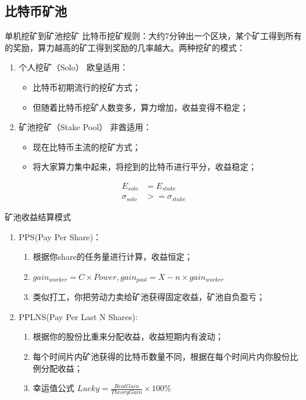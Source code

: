 \documentclass[11pt]{beamer}
\begin{document}
\subsection{比特币矿池}
\begin{frame}{单机挖矿到矿池挖矿}
	比特币挖矿规则：大约7分钟出一个区块，某个矿工得到所有的奖励，算力越高的矿工得到奖励的几率越大。两种挖矿的模式：
	\begin{enumerate}
		\item 个人挖矿（Solo）{\color{red} 欧皇适用}：
		      \begin{itemize}
			      \item 比特币初期流行的挖矿方式；
			      \item 但随着比特币挖矿人数变多，算力增加，收益变得不稳定；
		      \end{itemize}
		\item 矿池挖矿（Stake Pool）{\color{red} 非酋适用}：
		      \begin{itemize}
			      \item 现在比特币主流的挖矿方式；
			      \item 将大家算力集中起来，将挖到的比特币进行平分，收益稳定；
		      \end{itemize}
	\end{enumerate}
	\begin{align}
		E_{solo}      & =E_{stake}       \\
		\sigma_{solo} & >=\sigma_{stake}
	\end{align}
\end{frame}

\begin{frame}{矿池收益结算模式}
	\begin{enumerate}
		\item  PPS(Pay Per Share)：
		      \begin{enumerate}
			      \item 根据你share的任务量进行计算，{\color{red}收益恒定}；
			      \item $gain_{worker}=C\times Power,gain_{pool}=X-n\times gain_{worker}$
			      \item 类似打工，你把劳动力卖给矿池获得固定收益，矿池自负盈亏；
		      \end{enumerate}
		\item PPLNS(Pay Per Last N Shares):
		      \begin{enumerate}
			      \item 根据你的股份比重来分配收益，{\color{red}收益短期内有波动}；
			      \item 每个时间片内矿池获得的比特币数量不同，根据在每个时间片内你股份比例分配收益；
			      \item 幸运值公式 $Lucky = \frac{RealGain}{TheoryGain}\times 100 \%$
		      \end{enumerate}
	\end{enumerate}
\end{frame}
\end{document}
